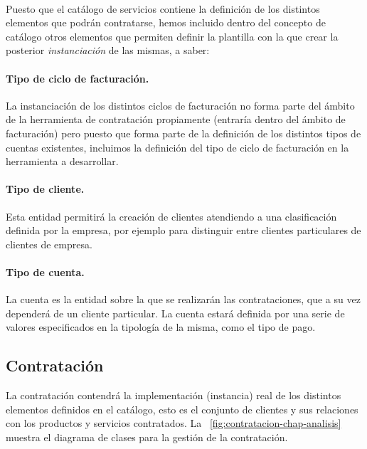 \paragraph{}
Puesto que el catálogo de servicios contiene la definición de los distintos elementos que podrán contratarse, hemos incluido dentro del concepto de catálogo otros elementos que permiten definir la plantilla con la que crear la posterior \textit{instanciación} de las mismas, a saber:

\paragraph{Tipo de ciclo de facturación.} La instanciación de los distintos ciclos de facturación no forma parte del ámbito de la herramienta de contratación propiamente (entraría dentro del ámbito de facturación) pero puesto que forma parte de la definición de los distintos tipos de cuentas existentes, incluimos la definición del tipo de ciclo de facturación en la herramienta a desarrollar.

\paragraph{Tipo de cliente.} Esta entidad permitirá la creación de clientes atendiendo a una clasificación definida por la empresa, por ejemplo para distinguir entre clientes particulares de clientes de empresa.

\paragraph{Tipo de cuenta.} La cuenta es la entidad sobre la que se realizarán las contrataciones, que a su vez dependerá de un cliente particular. La cuenta estará definida por una serie de valores especificados en la tipología de la misma, como el tipo de pago.



\subsection{Contratación}
\label{sub:contratacion-chap-analisis}
La contratación contendrá la implementación (instancia) real de los distintos elementos definidos en el catálogo, esto es el conjunto de clientes y sus relaciones con los productos y servicios contratados. La \figurename~\ref{fig:contratacion-chap-analisis} muestra el diagrama de clases para la gestión de la contratación.



